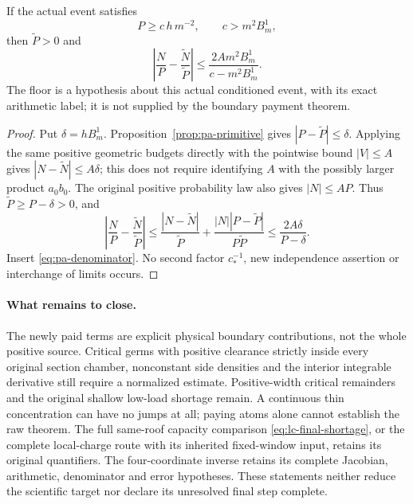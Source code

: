 \begin{proposition}
\label{prop:pa-ratio}
If the actual event satisfies
\begin{equation}\label{eq:pa-denominator}
             P\ge c\,h\,m^{-2},\qquad c>m^2B_m^1,
\end{equation}
then $\widetilde P>0$ and
\begin{equation}\label{eq:pa-ratio}
 \left|\frac NP-\frac{\widetilde N}{\widetilde P}\right|
              \le\frac{2A m^2B_m^1}{c-m^2B_m^1}.
\end{equation}
The floor is a hypothesis about this actual conditioned event,
with its exact arithmetic label; it is not supplied by the
boundary payment theorem.
\end{proposition}
\begin{proof}
Put $\delta=hB_m^1$. Proposition~\ref{prop:pa-primitive} gives
$|P-\widetilde P|\le\delta$. Applying the same positive
geometric budgets directly with the pointwise bound $|V|\le A$
gives $|N-\widetilde N|\le A\delta$; this does not require
identifying $A$ with the possibly larger product $a_0b_0$.
The original positive probability law also gives $|N|\le AP$.
Thus $\widetilde P\ge P-\delta>0$, and
\[
 \left|\frac NP-\frac{\widetilde N}{\widetilde P}\right|
 \le\frac{|N-\widetilde N|}{\widetilde P}
       +\frac{|N||P-\widetilde P|}{P\widetilde P}
 \le\frac{2A\delta}{P-\delta}.
\]
Insert \eqref{eq:pa-denominator}. No second factor $c_*^{-1}$,
new independence assertion or interchange of limits occurs.
\end{proof}

\paragraph{What remains to close.}
The newly paid terms are explicit physical boundary contributions,
not the whole positive source. Critical germs with positive
clearance strictly inside every original section chamber,
nonconstant side densities and the interior integrable
derivative still require a normalized estimate. Positive-width
critical remainders and the original shallow low-load shortage
remain. A continuous thin concentration can have no jumps at all;
paying atoms alone cannot establish the raw theorem. The full
same-roof capacity comparison \eqref{eq:lc-final-shortage}, or
the complete local-charge route with its inherited fixed-window
input, retains its original quantifiers. The four-coordinate
inverse retains its complete Jacobian, arithmetic, denominator
and error hypotheses. These statements neither reduce the
scientific target nor declare its unresolved final step complete.
